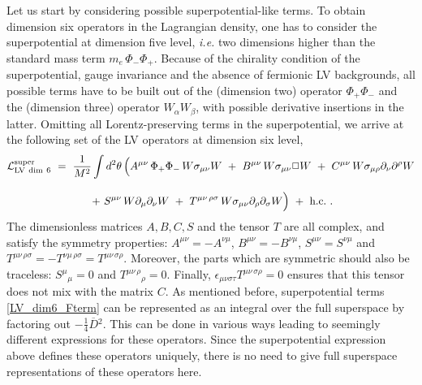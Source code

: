 \documentclass[12pt]{revtex4}
\begin{document}
Let us start by considering possible superpotential-like terms. 
To obtain dimension six operators in the Lagrangian density, 
one has to consider the superpotential at dimension five level, 
{\em i.e.} two dimensions higher than the standard mass term $m_e\,
\Phi_-\Phi_+$. Because of the chirality condition  of the
superpotential, gauge invariance and the absence of 
fermionic LV backgrounds,  all possible terms have to be built out of the
(dimension two) operator $\Phi_+ \Phi_-$ and the (dimension three)
operator $W_\alpha W_\beta$, with possible derivative insertions in  
the latter. Omitting all Lorentz-preserving terms in the
superpotential, we arrive at the following set of the LV operators at
dimension six level,  
%
\begin{gather} 
{\cal L}_{\rm{LV\ dim\ 6}}^{\rm{super}} ~=~ \frac{1}{M^2}
\int d^2 \theta \, \Big( 
A^{\mu\nu} \, \Phi_+ \Phi_-\, W \sigma_{\mu\nu} W ~+~ 
B^{\mu\nu} \, W \sigma_{\mu\nu} \Box W ~+~ 
C^{\mu\nu} \, W \sigma_{\mu\rho} \partial_\nu \partial^\rho W 
\nonumber \\[2ex]
~+~ 
S^{\mu\nu}\, W \partial_\mu \partial_\nu W ~+~ 
T^{\mu\nu\, \rho\sigma} \, 
W \sigma_{\mu\nu} \partial_\rho \partial_\sigma W 
\Big) ~+~ \text{h.c.}~. 
\label{LV_dim6_Fterm}
\end{gather}
%
The dimensionless matrices $A, B, C, S$ and the tensor $T$ are all complex,
and satisfy the symmetry properties: $A^{\mu\nu} = -A^{\nu\mu}$, 
$B^{\mu\nu} = -B^{\nu\mu}$, 
$S^{\mu\nu} =S^{\nu\mu}$ and 
$T^{\mu\nu\, \rho\sigma} = -T^{\nu\mu\, \rho\sigma} = 
T^{\mu\nu\, \sigma\rho}$. Moreover, the parts which are symmetric
should also be traceless: $S^\mu{}_\mu=0$ and 
$T^{\mu\nu\, \rho}{}_\rho = 0$. Finally,  
$\epsilon_{\mu\nu\sigma\tau}T^{\mu\nu\, \sigma\rho} = 0$ ensures that
this tensor does not mix with the matrix $C$. As mentioned before,
superpotential terms \eqref{LV_dim6_Fterm} can be represented as an
integral over the full superspace by factoring out $-\frac 14
\overline{D}{}^2$. This can be done in various ways leading to
seemingly different expressions for these operators. Since the
superpotential expression above defines these operators uniquely,
there is no need to give full superspace representations of 
these operators here. 
\end{document}
